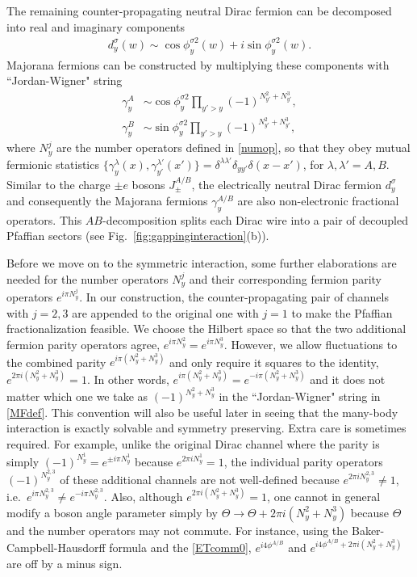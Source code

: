 The remaining counter-propagating neutral Dirac fermion can be decomposed into real and imaginary components \begin{align}d_y^{\sigma}(w)\sim\cos\phi^{\sigma2}_y(w)+i\sin\phi^{\sigma2}_y(w).\end{align} Majorana fermions can be constructed by multiplying these components with ``Jordan-Wigner" string \begin{align}\gamma^A_y&\sim\cos\phi^{\sigma2}_y\prod_{y'>y}(-1)^{N_{y'}^2+N_{y'}^3},\nonumber\\\gamma^B_y&\sim\sin\phi^{\sigma2}_y\prod_{y'>y}(-1)^{N_{y'}^2+N_{y'}^3},\label{MFdef}\end{align} where $N^j_y$ are the number operators defined in \eqref{numop}, so that they obey mutual fermionic statistics $\{\gamma^\lambda_y(x),\gamma^{\lambda'}_{y'}(x')\}=\delta^{\lambda\lambda'}\delta_{yy'}\delta(x-x')$, for $\lambda,\lambda'=A,B$. Similar to the charge  $\pm e$ bosons $J^{A/B}_\pm$, the electrically neutral Dirac fermion $d_y^\sigma$ and consequently the Majorana fermions $\gamma^{A/B}_y$ are also non-electronic fractional operators. This $AB$-decomposition splits each Dirac wire into a pair of decoupled Pfaffian sectors (see Fig.~\ref{fig:gappinginteraction}(b)).

Before we move on to the symmetric interaction, some further elaborations are needed for the number operators $N_y^j$ and their corresponding fermion parity operators $e^{i\pi N_y^j}$. In our construction, the counter-propagating pair of channels with $j=2,3$ are appended to the original one with $j=1$ to make the Pfaffian fractionalization feasible. We choose the Hilbert space so that the two additional fermion parity operators agree, $e^{i\pi N_y^2}=e^{i\pi N_y^3}$. However, we allow fluctuations to the combined parity $e^{i\pi(N_y^2+N_y^3)}$ and only require it squares to the identity, $e^{2\pi i(N_y^2+N_y^3)}=1$. In other words, $e^{i\pi(N_y^2+N_y^3)}=e^{-i\pi(N_y^2+N_y^3)}$ and it does not matter which one we take as $(-1)^{N_y^2+N_y^3}$ in the ``Jordan-Wigner" string in \eqref{MFdef}. This convention will also be useful later in seeing that the many-body interaction is exactly solvable and symmetry preserving. Extra care is sometimes required. For example, unlike the original Dirac channel where the parity is simply $(-1)^{N_y^1}=e^{\pm i\pi N_y^1}$ because $e^{2\pi iN_y^1}=1$, the individual parity operators $(-1)^{N_y^{2,3}}$ of these additional channels are not well-defined because $e^{2\pi iN_y^{2,3}}\neq1$, i.e.~$e^{i\pi N_y^{2,3}}\neq e^{-i\pi N_y^{2,3}}$. Also, although $e^{2\pi i(N_y^2+N_y^3)}=1$, one cannot in general modify a boson angle parameter simply by $\Theta\to\Theta+2\pi i(N_y^2+N_y^3)$ because $\Theta$ and the number operators may not commute. For instance, using the Baker-Campbell-Hausdorff formula and the \ETCR \eqref{ETcomm0}, $e^{i4\phi^{A/B}}$ and $e^{i4\phi^{A/B}+2\pi i(N_y^2+N_y^3)}$ are off by a minus sign.


